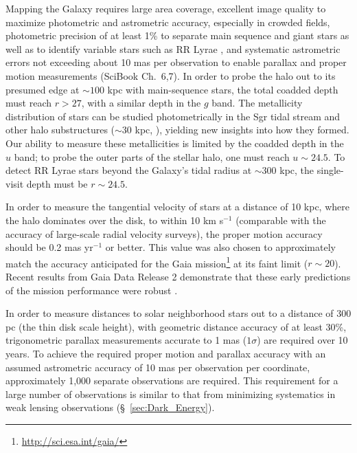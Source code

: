 Mapping the Galaxy requires large area coverage, excellent image
quality to maximize photometric and astrometric accuracy,
especially in crowded fields, photometric precision of at least 1\% to
separate main sequence and
giant stars \cite[e.g.,][]{2003ApJ...586..195H} as well as to identify variable
stars such as RR Lyrae \citep{2010ApJ...708..717S,2011ApJ...728..106S},
and systematic astrometric errors not exceeding about 10 mas per observation to enable parallax and proper motion measurements
(SciBook Ch.~6,7). In order to probe the halo out to its presumed edge at $\sim100$ kpc \citep{2004ASPC..327..104I}
with main-sequence stars, the total coadded depth must reach $r > 27$, with a similar depth in the $g$ band.
The metallicity distribution of stars can be studied photometrically in the Sgr tidal stream
\cite[e.g., see][]{2003ApJ...599.1082M,2007ApJ...670..346C} and other halo substructures
($\sim 30$ kpc, \citealt{2007Natur.450.1020C}), yielding new insights into how
they formed.  Our ability to measure these metallicities is limited by
the coadded depth in the $u$ band; to probe the outer parts of the
stellar halo, one must reach
$u\sim24.5$. To detect RR Lyrae stars beyond the Galaxy's tidal radius at $\sim 300$ kpc, the single-visit depth must
be $r \sim  24.5$.

In order to measure the tangential velocity of stars at a distance of 10 kpc, where the halo dominates over the disk, to
within 10 km s$^{-1}$ (comparable with the accuracy of large-scale radial velocity surveys), the proper motion
accuracy should be 0.2 mas yr$^{-1}$ or better. This value was also chosen to approximately match the accuracy
anticipated for the Gaia mission\footnote{\url{http://sci.esa.int/gaia/}} \citep{2001A&A...369..339P,2012Ap&SS.341...31D}
at its faint limit ($r \sim 20$). Recent results from Gaia Data Release 2 demonstrate that
these early predictions of the mission performance were robust \citep{2018A&A...616A...1G,2018A&A...616A...2L}.

In order to measure distances to solar neighborhood stars out to a distance of 300 pc (the thin disk scale height),
with geometric distance accuracy of at least 30\%, trigonometric parallax measurements accurate to 1 mas ($1\sigma$)
are required over 10 years. To achieve the required proper motion and parallax accuracy with an assumed astrometric
accuracy of 10 mas per observation per coordinate, approximately 1,000
separate observations are required. This requirement for a large
number of observations is similar to that from minimizing
systematics in weak lensing observations (\S~\ref{sec:Dark_Energy}).


